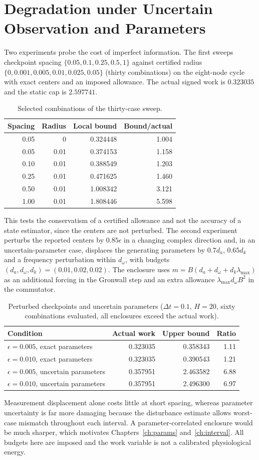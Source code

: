 \documentclass[11pt,notitlepage]{report}
\theoremstyle{definition}
\theoremstyle{remark}
\begin{document}
\section{Degradation under Uncertain Observation and Parameters}
Two experiments probe the cost of imperfect information. The first sweeps checkpoint spacing $\{0.05,0.1,0.25,0.5,1\}$ against certified radius $\{0,0.001,0.005,0.01,0.025,0.05\}$ (thirty combinations) on the eight-node cycle with exact centers and an imposed allowance. The actual signed work is $0.323035$ and the static cap is $2.597741$.
\begin{table}[ht]\centering\small
\caption{Selected combinations of the thirty-case sweep.}
\begin{tabular}{rrrr}\toprule
Spacing&Radius&Local bound&Bound/actual\\\midrule
0.05&0&0.324448&1.004\\
0.05&0.01&0.374153&1.158\\
0.10&0.01&0.388549&1.203\\
0.25&0.01&0.471625&1.460\\
0.50&0.01&1.008342&3.121\\
1.00&0.01&1.808446&5.598\\\bottomrule
\end{tabular}
\end{table}
This tests the conservatism of a certified allowance and not the accuracy of a state estimator, since the centers are not perturbed. The second experiment perturbs the reported centers by $0.85\epsilon$ in a changing complex direction and, in an uncertain-parameter case, displaces the generating parameters by $0.7d_a$, $0.65d_k$ and a frequency perturbation within $d_\omega$, with budgets $(d_a,d_\omega,d_k)=(0.01,0.02,0.02)$. The enclosure uses $m=B(d_a+d_\omega+d_k\lambda_{\max})$ as an additional forcing in the Gronwall step and an extra allowance $\lambda_{\max}d_\omega B^2$ in the commutator.
\begin{table}[ht]\centering\small
\caption{Perturbed checkpoints and uncertain parameters ($\Delta t=0.1$, $H=20$, sixty combinations evaluated, all enclosures exceed the actual work).}
\begin{tabular}{lrrr}\toprule
Condition&Actual work&Upper bound&Ratio\\\midrule
$\epsilon=0.005$, exact parameters&0.323035&0.358343&1.11\\
$\epsilon=0.010$, exact parameters&0.323035&0.390543&1.21\\
$\epsilon=0.005$, uncertain parameters&0.357951&2.463582&6.88\\
$\epsilon=0.010$, uncertain parameters&0.357951&2.496300&6.97\\\bottomrule
\end{tabular}
\end{table}
Measurement displacement alone costs little at short spacing, whereas parameter uncertainty is far more damaging because the disturbance estimate allows worst-case mismatch throughout each interval. A parameter-correlated enclosure would be much sharper, which motivates Chapters~\ref{ch:params} and~\ref{ch:interval}. All budgets here are imposed and the work variable is not a calibrated physiological energy.
\end{document}
